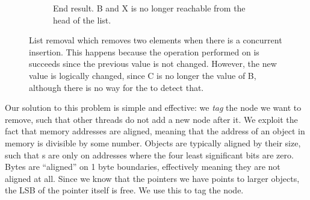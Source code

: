 \documentclass[b5paper]{report}
\begin{document}
\begin{figure}[ht]
  \begin{subfigure}[b]{\textwidth}
      \centering
      \caption{End result. B and X is no longer reachable from the head of the
        list.\label{fig:list-remove-c}}
  \end{subfigure}
  \caption{List removal which removes two elements when there is a concurrent
  insertion. This happens because the  operation
  performed on  is succeeds since the previous value is not
  changed.  However, the new value is logically changed, since C is no longer
  the  value of B, although there is no way for the  to
  detect that.\label{fig:list-remove}} \end{figure}

Our solution to this problem is simple and effective: we \emph{tag} the node we
want to remove, such that other threads do not add a new node after it. We
exploit the fact that memory addresses are aligned, meaning that the address of
an object in memory is divisible by some number. Objects are typically aligned
by their size, such that s are only on addresses where the four least
significant bits are zero. Bytes are ``aligned'' on 1 byte boundaries,
effectively meaning they are not aligned at all. Since we know that the pointers
we have points to larger objects, the LSB of the pointer itself is free. We use
this to tag the node.
\end{document}
